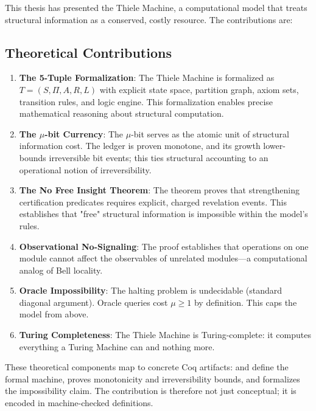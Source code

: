 This thesis has presented the Thiele Machine, a computational model that treats structural information as a conserved, costly resource. The contributions are:

\subsection{Theoretical Contributions}

\begin{enumerate}
    \item \textbf{The 5-Tuple Formalization}: The Thiele Machine is formalized as $T = (S, \Pi, A, R, L)$ with explicit state space, partition graph, axiom sets, transition rules, and logic engine. This formalization enables precise mathematical reasoning about structural computation.
    
    \item \textbf{The $\mu$-bit Currency}: The $\mu$-bit serves as the atomic unit of structural information cost. The ledger is proven monotone, and its growth lower-bounds irreversible bit events; this ties structural accounting to an operational notion of irreversibility.
    
    \item \textbf{The No Free Insight Theorem}: The theorem proves that strengthening certification predicates requires explicit, charged revelation events. This establishes that "free" structural information is impossible within the model's rules.
    
    \item \textbf{Observational No-Signaling}: The proof establishes that operations on one module cannot affect the observables of unrelated modules---a computational analog of Bell locality.
    
    \item \textbf{Oracle Impossibility}: The halting problem is undecidable (standard diagonal argument). Oracle queries cost $\mu \geq 1$ by definition. This caps the model from above.

    \item \textbf{Turing Completeness}: The Thiele Machine is Turing-complete: it computes everything a Turing Machine can and nothing more.
\end{enumerate}
These theoretical components map to concrete Coq artifacts:  and  define the formal machine,  proves monotonicity and irreversibility bounds, and  formalizes the impossibility claim. The contribution is therefore not just conceptual; it is encoded in machine-checked definitions.

